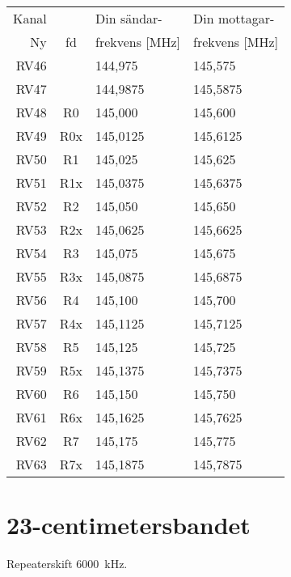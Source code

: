 \begin{tabular}{ r | c | l | l }
	Kanal & & Din sändar- & Din mottagar- \\
	Ny    & fd & frekvens [\si{\mega\hertz}] & frekvens [\si{\mega\hertz}] \\
	\hline
	RV46 & & 144,975 & 145,575\\
	RV47 & & 144,9875 & 145,5875\\
	RV48 & R0 & 145,000 & 145,600 \\
	RV49 & R0x & 145,0125 & 145,6125 \\
	RV50 & R1 & 145,025 & 145,625 \\
	RV51 & R1x & 145,0375 & 145,6375 \\
	RV52 & R2 & 145,050 & 145,650 \\
	RV53 & R2x & 145,0625 & 145,6625 \\
	RV54 & R3 & 145,075 & 145,675 \\
	RV55 & R3x & 145,0875 & 145,6875 \\
	RV56 & R4 & 145,100 & 145,700 \\
	RV57 & R4x & 145,1125 & 145,7125 \\
	RV58 & R5 & 145,125 & 145,725 \\
	RV59 & R5x & 145,1375 & 145,7375 \\
	RV60 & R6 & 145,150 & 145,750 \\
	RV61 & R6x & 145,1625 & 145,7625 \\
	RV62 & R7 & 145,175 & 145,775 \\
	RV63 & R7x & 145,1875 & 145,7875 \\
\end{tabular}

\section{23-centimetersbandet}
Repeaterskift \SI{6000}{\kilo\hertz}.

